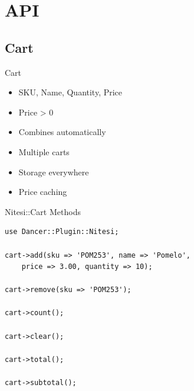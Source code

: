 




\section{API}
\subsection{Cart}
\begin{frame}{Cart}
\begin{itemize}
\item SKU, Name, Quantity, Price
\item Price > 0
\item Combines automatically
\item Multiple carts
\item Storage everywhere
\item Price caching
\end{itemize}
\end{frame}

\begin{frame}[fragile]{Nitesi::Cart Methods}
\begin{lstlisting}
use Dancer::Plugin::Nitesi;

cart->add(sku => 'POM253', name => 'Pomelo',
    price => 3.00, quantity => 10);

cart->remove(sku => 'POM253');

cart->count();

cart->clear();

cart->total();

cart->subtotal();
\end{lstlisting}
\end{frame}

